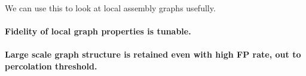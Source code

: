 \documentclass[12pt]{article} \usepackage{simplemargins}
\begin{document}
We can use this to look at local assembly graphs usefully.

\paragraph{Fidelity of local graph properties is tunable.}

\begin{figure}
\end{figure}

\paragraph{Large scale graph structure is retained even with high FP rate, out to percolation threshold.}

\begin{figure}
\end{figure}
\end{document}
